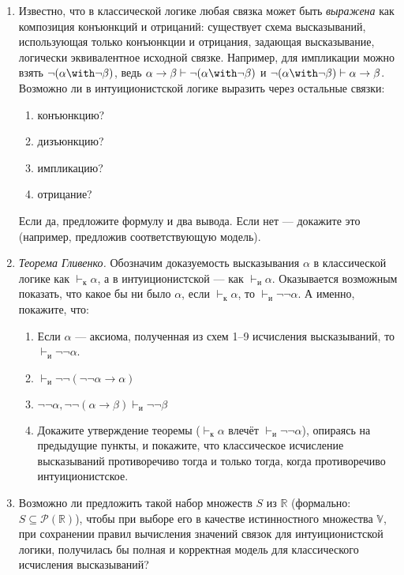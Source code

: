 \documentclass[10pt,a4paper,oneside]{article}
\begin{document}
\begin{enumerate}
\item Известно, что в классической логике любая связка может быть \emph{выражена} как композиция 
конъюнкций и отрицаний: существует схема высказываний, использующая только конъюнкции и отрицания, 
задающая высказывание, логически эквивалентное исходной связке. 
Например, для импликации можно взять $\neg(\alpha\with\neg\beta)$, ведь 
$\alpha\rightarrow\beta\vdash\neg(\alpha\with\neg\beta)$ и $\neg(\alpha\with\neg\beta)\vdash\alpha\rightarrow\beta$. 
Возможно ли в интуиционистской логике выразить через остальные связки:
\begin{enumerate}
\item конъюнкцию?
\item дизъюнкцию?
\item импликацию?
\item отрицание?
\end{enumerate}
Если да, предложите формулу и два вывода. Если нет --- докажите это (например, предложив соответствующую
модель).

\item \emph{Теорема Гливенко.} Обозначим доказуемость высказывания $\alpha$ в классической логике 
как $\vdash_\text{к}\alpha$, а в интуиционистской --- как $\vdash_\text{и}\alpha$. 
Оказывается возможным показать, что какое бы ни было $\alpha$, если $\vdash_\text{к}\alpha$, 
то $\vdash_\text{и}\neg\neg\alpha$. А именно, покажите, что:

\begin{enumerate}
\item Если $\alpha$ --- аксиома, полученная из схем 1--9 исчисления высказываний, то $\vdash_\text{и}\neg\neg\alpha$.
\item $\vdash_\text{и}\neg\neg(\neg\neg\alpha\rightarrow\alpha)$
\item $\neg\neg\alpha,\neg\neg(\alpha\rightarrow\beta) \vdash_\text{и}\neg\neg\beta$
\item Докажите утверждение теоремы ($\vdash_\text{к}\alpha$ влечёт $\vdash_\text{и}\neg\neg\alpha$),
опираясь на предыдущие пункты, и покажите, что классическое исчисление высказываний противоречиво
тогда и только тогда, когда противоречиво интуиционистское.
\end{enumerate}

\item Возможно ли предложить такой набор множеств $S$ из $\mathbb{R}$ (формально: $S \subseteq \mathcal{P}(\mathbb{R})$), 
чтобы при выборе его в качестве истинностного множества $\mathbb{V}$, при сохранении правил вычисления
значений связок для интуиционистской логики, получилась бы полная и корректная модель для классического 
исчисления высказываний?


\end{enumerate}
\end{document}
